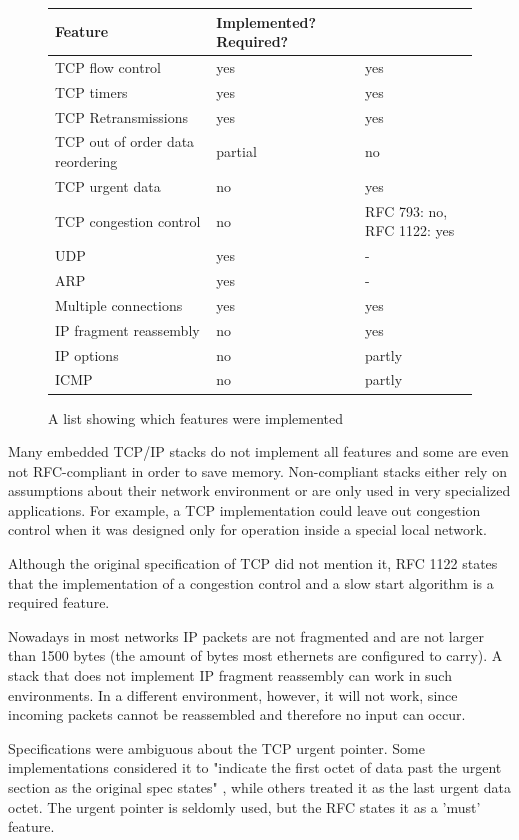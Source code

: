 \documentclass[11pt,twoside,abstract,notitlepage]{scrreprt}
\begin{document}
\begin{figure}
\caption{A list showing which features were implemented}
\label{fig:features}
\renewcommand{\arraystretch}{1.2}
\begin{tabularx}{\textwidth}{X|X|X}
Feature & Implemented? Required? \\ \hline
TCP flow control & yes & yes\\ \hline
TCP timers & yes & yes \\ \hline
TCP Retransmissions & yes & yes \\ \hline
TCP out of order data reordering & partial & no \\ \hline
TCP urgent data & no & yes \\ \hline
TCP congestion control & no & RFC 793: no, RFC 1122: yes\\ \hline
UDP & yes & - \\ \hline
ARP & yes & - \\ \hline
Multiple connections & yes & yes \\ \hline
IP fragment reassembly & no & yes \\ \hline
IP options & no & partly \\ \hline
ICMP & no & partly \\ \hline
\end{tabularx}
\end{figure}

Many embedded TCP/IP stacks do not implement all features and some are even not RFC-compliant in order to save memory. Non-compliant stacks either rely on assumptions about their network environment or are only used in very specialized applications. For example, a TCP implementation could leave out congestion control when it was designed only for operation inside a special local network. 

Although the original specification of TCP did not mention it, RFC 1122 states that the implementation of a congestion control and a slow start algorithm is a required feature. 

Nowadays in most networks IP packets are not fragmented and are not larger than 1500 bytes (the amount of bytes most ethernets are configured to  carry). A stack that does not implement IP fragment reassembly can work in such environments. In a different environment, however, it will not work, since incoming packets cannot be reassembled and therefore no input can occur. 

Specifications were ambiguous about the TCP urgent pointer. Some implementations considered it to "indicate the first octet of data past the urgent section as the original spec states" \cite[p. 984]{stevens95}, while others treated it as the last urgent data octet. The urgent pointer is seldomly used, but the RFC states it as a 'must' feature.
\end{document}
